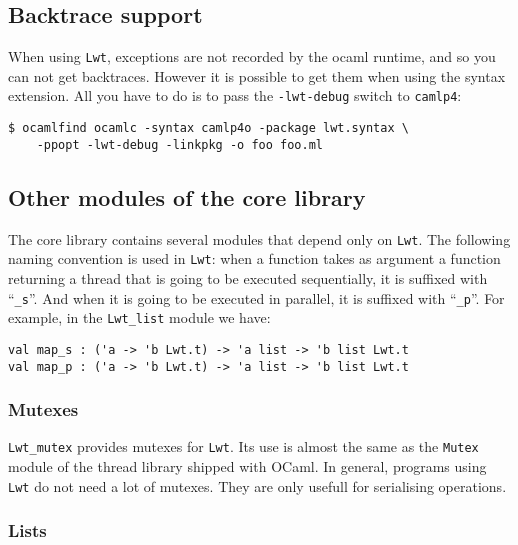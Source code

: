 \subsection{ Backtrace support }

When using {\tt Lwt}, exceptions are not recorded by the ocaml runtime, and so you can not
get backtraces. However it is possible to get them when using the syntax extension. All you
have to do is to pass the {\tt -lwt-debug} switch to {\tt camlp4}:



\begin{verbatim}
$ ocamlfind ocamlc -syntax camlp4o -package lwt.syntax \
    -ppopt -lwt-debug -linkpkg -o foo foo.ml

\end{verbatim}

\subsection{ Other modules of the core library }

The core library contains several modules that depend only on
{\tt Lwt}. The following naming convention is used in {\tt Lwt}: when a
function takes as argument a function returning a thread that is going
to be executed sequentially, it is suffixed with ``{\tt \_s}''. And
when it is going to be executed in parallel, it is suffixed with
``{\tt \_p}''. For example, in the {\tt Lwt\_list} module we have:



\lstset{language=[Objective]Caml}\begin{lstlisting}
val map_s : ('a -> 'b Lwt.t) -> 'a list -> 'b list Lwt.t
val map_p : ('a -> 'b Lwt.t) -> 'a list -> 'b list Lwt.t

\end{lstlisting}
\subsubsection{ Mutexes }

{\tt Lwt\_mutex} provides mutexes for {\tt Lwt}. Its use is almost the
same as the {\tt Mutex} module of the thread library shipped with
OCaml. In general, programs using {\tt Lwt} do not need a lot of
mutexes. They are only usefull for serialising operations.



\subsubsection{ Lists }

